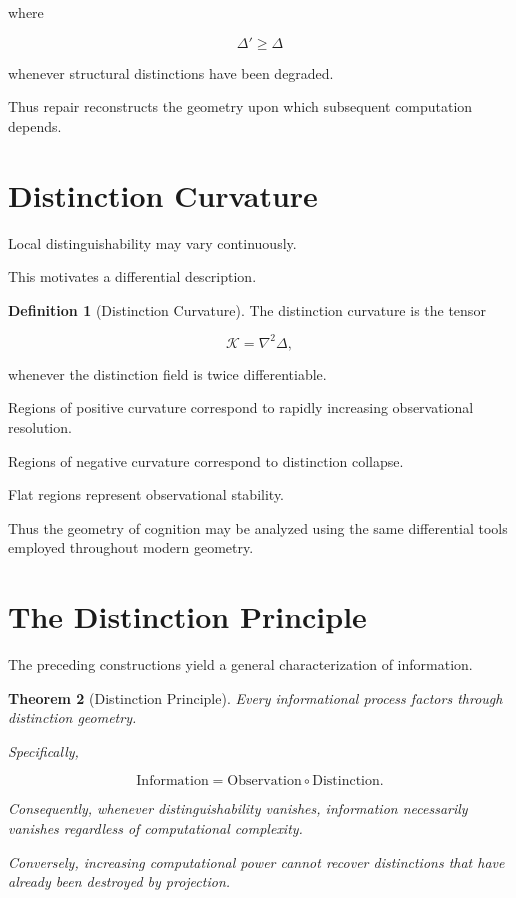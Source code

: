 \documentclass[11pt,oneside]{book}
\numberwithin{equation}{chapter}
\theoremstyle{definition}
\newtheorem{definition}{Definition}[chapter]
\theoremstyle{plain}
\newtheorem{theorem}[definition]{Theorem}
\begin{document}
where

\[
\Delta'
\ge
\Delta
\]

whenever structural distinctions have been degraded.

Thus repair reconstructs the geometry upon which subsequent computation
depends.

\section{Distinction Curvature}

Local distinguishability may vary continuously.

This motivates a differential description.

\begin{definition}[Distinction Curvature]

The distinction curvature is the tensor

\[
\mathcal{K}
=
\nabla^2
\Delta,
\]

whenever the distinction field is twice differentiable.

\end{definition}

Regions of positive curvature correspond to rapidly increasing observational
resolution.

Regions of negative curvature correspond to distinction collapse.

Flat regions represent observational stability.

Thus the geometry of cognition may be analyzed using the same differential
tools employed throughout modern geometry.

\section{The Distinction Principle}

The preceding constructions yield a general characterization of information.

\begin{theorem}[Distinction Principle]

Every informational process factors through distinction geometry.

Specifically,

\[
\text{Information}
=
\text{Observation}
\circ
\text{Distinction}.
\]

Consequently, whenever distinguishability vanishes, information necessarily
vanishes regardless of computational complexity.

Conversely, increasing computational power cannot recover distinctions that
have already been destroyed by projection.

\end{theorem}
\end{document}
